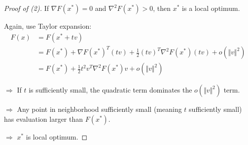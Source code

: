 \begin{proof}[Proof of (2)]
	If $\nabla F(x^*) = 0$ and $\nabla^2 F(x^*) > 0$, then $x^*$ is a local optimum.
	
	Again, use Taylor expansion: 
	\begin{align*}
	F(x) &= F(x^* + tv) \\
	&= F(x^*) + \nabla F(x^*)^T(tv) + \frac{1}{2}(tv)^T\nabla^2F(x^*)(tv) + o(\Vert v \Vert^2)\\
	&= F(x^*) + \frac{1}{2}t^2v^T\nabla^2F(x^*)v + o(\Vert v \Vert^2)
	\end{align*}
	
	$\Rightarrow$ If $t$ is sufficiently small, the quadratic term dominates the $o(\Vert v \Vert^2)$ term.
	
	$\Rightarrow$ Any point in neighborhood sufficiently small (meaning $t$ sufficiently small) has evaluation larger than $F(x^*)$.
	
	$\Rightarrow$ $x^*$ is local optimum. 
\end{proof}

